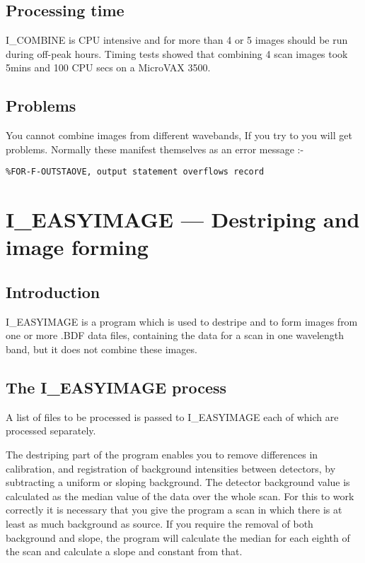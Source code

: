 \subsection {Processing time}

I\_COMBINE is CPU intensive and for more than 4 or 5 images should be run 
during off-peak hours. Timing tests showed that combining 4 scan images
took 5mins and 100 CPU secs on a MicroVAX 3500.

\subsection {Problems}

You cannot combine images from different wavebands, If you try to you will get
problems. Normally these manifest themselves as an error message :-
\begin{verbatim}
%FOR-F-OUTSTAOVE, output statement overflows record
\end{verbatim}
\pagebreak

\section{I\_EASYIMAGE --- Destriping and image forming}

\subsection {Introduction}

I\_EASYIMAGE is a program which is used to destripe and to form images from one
or more .BDF data files, containing the data for a scan in one wavelength band, 
but it does not combine these images.

\subsection {The I\_EASYIMAGE process}

A list of files to be processed is passed to I\_EASYIMAGE each of which are
processed separately.

The destriping part of the program enables you to remove differences in 
calibration, and registration of background intensities between detectors, 
by subtracting a uniform or sloping background. The detector background value 
is calculated as the median value of the data over the whole scan. For this to
work correctly it is necessary that you give the program a scan in which there 
is at least as much background as source. If you require the removal of both 
background and slope, the program will calculate the median for each eighth of 
the scan and calculate a slope and constant from that. 

